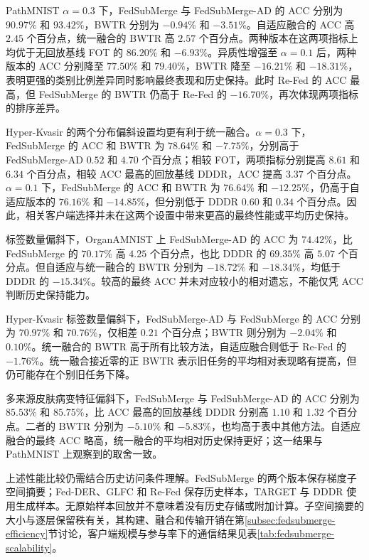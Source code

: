 PathMNIST $\alpha=0.3$ 下，FedSubMerge 与 FedSubMerge-AD 的 ACC 分别为 $90.97\%$ 和 $93.42\%$，BWTR 分别为 $-0.94\%$ 和 $-3.51\%$。自适应融合的 ACC 高 $2.45$ 个百分点，统一融合的 BWTR 高 $2.57$ 个百分点。两种版本在这两项指标上均优于无回放基线 FOT 的 $86.20\%$ 和 $-6.93\%$。异质性增强至 $\alpha=0.1$ 后，两种版本的 ACC 分别降至 $77.50\%$ 和 $79.40\%$，BWTR 降至 $-16.21\%$ 和 $-18.31\%$，表明更强的类别比例差异同时影响最终表现和历史保持。此时 Re-Fed 的 ACC 最高，但 FedSubMerge 的 BWTR 仍高于 Re-Fed 的 $-16.70\%$，再次体现两项指标的排序差异。

Hyper-Kvasir 的两个分布偏斜设置均更有利于统一融合。$\alpha=0.3$ 下，FedSubMerge 的 ACC 和 BWTR 为 $78.64\%$ 和 $-7.75\%$，分别高于 FedSubMerge-AD $0.52$ 和 $4.70$ 个百分点；相较 FOT，两项指标分别提高 $8.61$ 和 $6.34$ 个百分点，相较 ACC 最高的回放基线 DDDR，ACC 提高 $3.37$ 个百分点。$\alpha=0.1$ 下，FedSubMerge 的 ACC 和 BWTR 为 $76.64\%$ 和 $-12.25\%$，仍高于自适应版本的 $76.16\%$ 和 $-14.85\%$，但分别低于 DDDR $0.60$ 和 $0.34$ 个百分点。因此，相关客户端选择并未在这两个设置中带来更高的最终性能或平均历史保持。

标签数量偏斜下，OrganAMNIST 上 FedSubMerge-AD 的 ACC 为 $74.42\%$，比 FedSubMerge 的 $70.17\%$ 高 $4.25$ 个百分点，也比 DDDR 的 $69.35\%$ 高 $5.07$ 个百分点。但自适应与统一融合的 BWTR 分别为 $-18.72\%$ 和 $-18.34\%$，均低于 DDDR 的 $-15.34\%$。较高的最终 ACC 并未对应较小的相对遗忘，不能仅凭 ACC 判断历史保持能力。

Hyper-Kvasir 标签数量偏斜下，FedSubMerge-AD 与 FedSubMerge 的 ACC 分别为 $70.97\%$ 和 $70.76\%$，仅相差 $0.21$ 个百分点；BWTR 则分别为 $-2.04\%$ 和 $0.10\%$。统一融合的 BWTR 高于所有比较方法，自适应融合则低于 Re-Fed 的 $-1.76\%$。统一融合接近零的正 BWTR 表示旧任务的平均相对表现略有提高，但仍可能存在个别旧任务下降。

多来源皮肤病变特征偏斜下，FedSubMerge 与 FedSubMerge-AD 的 ACC 分别为 $85.53\%$ 和 $85.75\%$，比 ACC 最高的回放基线 DDDR 分别高 $1.10$ 和 $1.32$ 个百分点。二者的 BWTR 分别为 $-5.10\%$ 和 $-5.83\%$，也均高于表中其他方法。自适应融合的最终 ACC 略高，统一融合的平均相对历史保持更好；这一结果与 PathMNIST 上观察到的取舍一致。

上述性能比较仍需结合历史访问条件理解。FedSubMerge 的两个版本保存梯度子空间摘要；Fed-DER、GLFC 和 Re-Fed 保存历史样本，TARGET 与 DDDR 使用生成样本。无原始样本回放并不意味着没有历史存储或附加计算。子空间摘要的大小与逐层保留秩有关，其构建、融合和传输开销在第\ref{subsec:fedsubmerge-efficiency}节讨论，客户端规模与参与率下的通信结果见表\ref{tab:fedsubmerge-scalability}。

